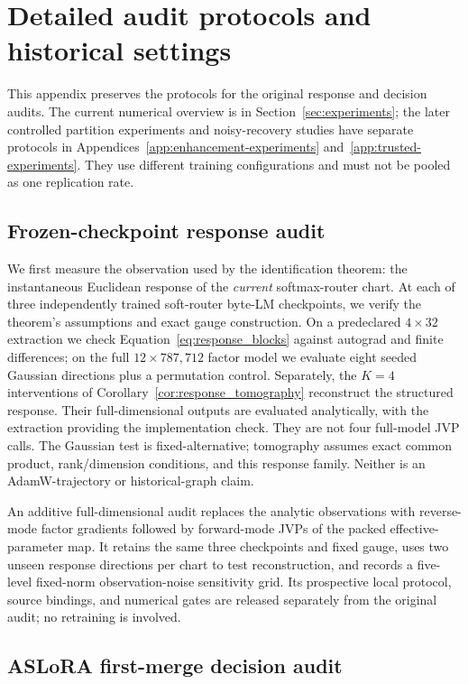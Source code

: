 \section{Detailed audit protocols and historical settings}
\label{sec:benchmark}

This appendix preserves the protocols for the original response and
decision audits. The current numerical overview is in
Section~\ref{sec:experiments}; the later controlled partition experiments and
noisy-recovery studies have separate protocols in
Appendices~\ref{app:enhancement-experiments} and~\ref{app:trusted-experiments}.
They use different training configurations and must not be pooled as one
replication rate.

\subsection{Frozen-checkpoint response audit}

We first measure the observation used by the identification theorem: the
instantaneous Euclidean response of the \emph{current} softmax-router chart.
At each of three independently trained soft-router byte-LM checkpoints, we
verify the theorem's assumptions and exact gauge construction.  On a
predeclared $4\times32$ extraction we check
Equation~\ref{eq:response_blocks} against autograd and finite differences; on
the full $12\times787{,}712$ factor model we evaluate eight seeded Gaussian
directions plus a permutation control.  Separately, the $K=4$ interventions of
Corollary~\ref{cor:response_tomography} reconstruct the structured response.
Their full-dimensional outputs are evaluated analytically, with the
extraction providing the implementation check. They are not four
full-model JVP calls.
The Gaussian test is fixed-alternative; tomography assumes exact common
product, rank/dimension conditions, and this response family.  Neither is an
AdamW-trajectory or historical-graph claim.

An additive full-dimensional audit replaces the analytic observations with
reverse-mode factor gradients followed by forward-mode JVPs of the packed
effective-parameter map. It retains the same three checkpoints and fixed
gauge, uses two unseen response directions per chart to test reconstruction,
and records a five-level fixed-norm observation-noise sensitivity grid.
Its prospective local protocol, source bindings, and numerical gates are
released separately from the original audit; no retraining is involved.

\subsection{ASLoRA first-merge decision audit}
\label{sec:aslora-protocol}

